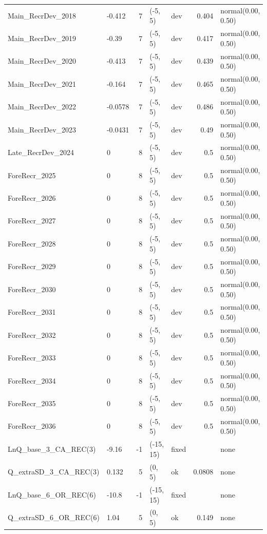\documentclass[
]{scrartcl}
\begin{document}
\begin{longtable}{llrllrl}
Main\_RecrDev\_2018 & -0.412 & 7 & (-5, 5) & dev & 0.404 & normal(0.00, 0.50) \\ 
Main\_RecrDev\_2019 & -0.39 & 7 & (-5, 5) & dev & 0.417 & normal(0.00, 0.50) \\ 
Main\_RecrDev\_2020 & -0.413 & 7 & (-5, 5) & dev & 0.439 & normal(0.00, 0.50) \\ 
Main\_RecrDev\_2021 & -0.164 & 7 & (-5, 5) & dev & 0.465 & normal(0.00, 0.50) \\ 
Main\_RecrDev\_2022 & -0.0578 & 7 & (-5, 5) & dev & 0.486 & normal(0.00, 0.50) \\ 
Main\_RecrDev\_2023 & -0.0431 & 7 & (-5, 5) & dev & 0.49 & normal(0.00, 0.50) \\ 
Late\_RecrDev\_2024 & 0 & 8 & (-5, 5) & dev & 0.5 & normal(0.00, 0.50) \\ 
ForeRecr\_2025 & 0 & 8 & (-5, 5) & dev & 0.5 & normal(0.00, 0.50) \\ 
ForeRecr\_2026 & 0 & 8 & (-5, 5) & dev & 0.5 & normal(0.00, 0.50) \\ 
ForeRecr\_2027 & 0 & 8 & (-5, 5) & dev & 0.5 & normal(0.00, 0.50) \\ 
ForeRecr\_2028 & 0 & 8 & (-5, 5) & dev & 0.5 & normal(0.00, 0.50) \\ 
ForeRecr\_2029 & 0 & 8 & (-5, 5) & dev & 0.5 & normal(0.00, 0.50) \\ 
ForeRecr\_2030 & 0 & 8 & (-5, 5) & dev & 0.5 & normal(0.00, 0.50) \\ 
ForeRecr\_2031 & 0 & 8 & (-5, 5) & dev & 0.5 & normal(0.00, 0.50) \\ 
ForeRecr\_2032 & 0 & 8 & (-5, 5) & dev & 0.5 & normal(0.00, 0.50) \\ 
ForeRecr\_2033 & 0 & 8 & (-5, 5) & dev & 0.5 & normal(0.00, 0.50) \\ 
ForeRecr\_2034 & 0 & 8 & (-5, 5) & dev & 0.5 & normal(0.00, 0.50) \\ 
ForeRecr\_2035 & 0 & 8 & (-5, 5) & dev & 0.5 & normal(0.00, 0.50) \\ 
ForeRecr\_2036 & 0 & 8 & (-5, 5) & dev & 0.5 & normal(0.00, 0.50) \\ 
LnQ\_base\_3\_CA\_REC(3) & -9.16 & -1 & (-15, 15) & fixed &  & none \\ 
Q\_extraSD\_3\_CA\_REC(3) & 0.132 & 5 & (0, 5) & ok & 0.0808 & none \\ 
LnQ\_base\_6\_OR\_REC(6) & -10.8 & -1 & (-15, 15) & fixed &  & none \\ 
Q\_extraSD\_6\_OR\_REC(6) & 1.04 & 5 & (0, 5) & ok & 0.149 & none \\ 

\end{longtable}
\end{document}
